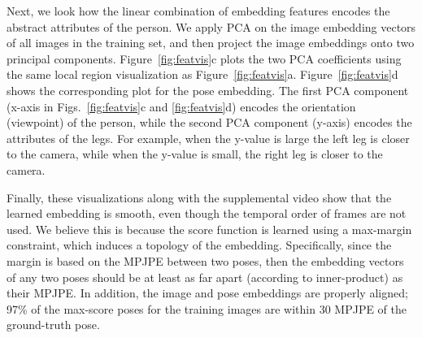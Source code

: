 \documentclass[10pt,twocolumn,letterpaper]{article}
\begin{document}
Next, we look how the linear combination of embedding features encodes the abstract attributes of the person.
We apply PCA on the image embedding vectors of all images in the training set, and then project the image embeddings onto two principal components.
Figure~\ref{fig:featvis}c plots the two PCA coefficients using the same local region visualization as Figure~\ref{fig:featvis}a.  Figure~\ref{fig:featvis}d shows the corresponding plot for the pose embedding.
The first PCA component (x-axis in Figs.~\ref{fig:featvis}c and \ref{fig:featvis}d) encodes the orientation (viewpoint) of the person, while 
the second PCA component (y-axis) encodes the attributes of the legs.  
For example, when the y-value is large the left leg is closer to the camera, while when the y-value is small, the right leg is closer to the camera.

Finally, these visualizations along with the supplemental video show that the learned embedding is smooth, even though the temporal order of frames are not used. We believe this is because the score function is learned using a max-margin constraint, which induces a topology of the embedding. Specifically, since the margin is based on the MPJPE between two poses, then the embedding vectors of any two poses should be at least as far apart (according to inner-product) as their MPJPE.
In addition, the  image and pose embeddings are properly aligned; 97\% of the max-score poses for the training images are within 30 MPJPE of the ground-truth pose.
\end{document}

